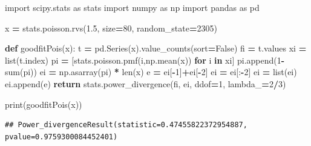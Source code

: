 \documentclass[polish,]{book}
\newenvironment{Shaded}{\begin{snugshade}}{\end{snugshade}}
\newcommand{\BuiltInTok}[1]{#1}
\newcommand{\ControlFlowTok}[1]{\textcolor[rgb]{0.13,0.29,0.53}{\textbf{#1}}}
\newcommand{\DecValTok}[1]{\textcolor[rgb]{0.00,0.00,0.81}{#1}}
\newcommand{\FloatTok}[1]{\textcolor[rgb]{0.00,0.00,0.81}{#1}}
\newcommand{\ImportTok}[1]{#1}
\newcommand{\KeywordTok}[1]{\textcolor[rgb]{0.13,0.29,0.53}{\textbf{#1}}}
\newcommand{\NormalTok}[1]{#1}
\newcommand{\OperatorTok}[1]{\textcolor[rgb]{0.81,0.36,0.00}{\textbf{#1}}}
\newcommand{\VariableTok}[1]{\textcolor[rgb]{0.00,0.00,0.00}{#1}}
\begin{document}
\begin{Shaded}
\begin{Highlighting}[]
\ImportTok{import}\NormalTok{ scipy.stats }\ImportTok{as}\NormalTok{ stats}
\ImportTok{import}\NormalTok{ numpy }\ImportTok{as}\NormalTok{ np}
\ImportTok{import}\NormalTok{ pandas }\ImportTok{as}\NormalTok{ pd}

\NormalTok{x }\OperatorTok{=}\NormalTok{ stats.poisson.rvs(}\FloatTok{1.5}\NormalTok{, size}\OperatorTok{=}\DecValTok{80}\NormalTok{, random_state}\OperatorTok{=}\DecValTok{2305}\NormalTok{)}
    
\KeywordTok{def}\NormalTok{ goodfitPois(x): }
\NormalTok{    t }\OperatorTok{=}\NormalTok{ pd.Series(x).value_counts(sort}\OperatorTok{=}\VariableTok{False}\NormalTok{)}
\NormalTok{    fi }\OperatorTok{=}\NormalTok{ t.values}
\NormalTok{    xi }\OperatorTok{=} \BuiltInTok{list}\NormalTok{(t.index)}
\NormalTok{    pi }\OperatorTok{=}\NormalTok{ [stats.poisson.pmf(i,np.mean(x)) }\ControlFlowTok{for}\NormalTok{ i }\KeywordTok{in}\NormalTok{ xi]}
\NormalTok{    pi.append(}\DecValTok{1}\OperatorTok{-}\BuiltInTok{sum}\NormalTok{(pi))}
\NormalTok{    ei }\OperatorTok{=}\NormalTok{ np.asarray(pi) }\OperatorTok{*} \BuiltInTok{len}\NormalTok{(x)}
\NormalTok{    e }\OperatorTok{=}\NormalTok{ ei[}\OperatorTok{-}\DecValTok{1}\NormalTok{]}\OperatorTok{+}\NormalTok{ei[}\OperatorTok{-}\DecValTok{2}\NormalTok{]}
\NormalTok{    ei }\OperatorTok{=}\NormalTok{ ei[:}\OperatorTok{-}\DecValTok{2}\NormalTok{]}
\NormalTok{    ei }\OperatorTok{=} \BuiltInTok{list}\NormalTok{(ei)}
\NormalTok{    ei.append(e)}
    \ControlFlowTok{return}\NormalTok{ stats.power_divergence(fi, ei, ddof}\OperatorTok{=}\DecValTok{1}\NormalTok{, lambda_}\OperatorTok{=}\DecValTok{2}\OperatorTok{/}\DecValTok{3}\NormalTok{)}
  
\BuiltInTok{print}\NormalTok{(goodfitPois(x))}
\end{Highlighting}
\end{Shaded}

\begin{verbatim}
## Power_divergenceResult(statistic=0.47455822372954887, pvalue=0.9759300084452401)
\end{verbatim}
\end{document}
